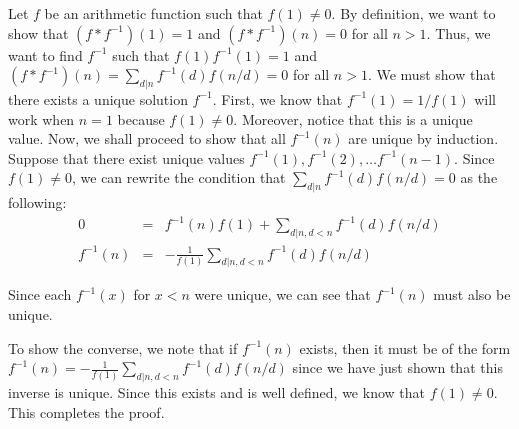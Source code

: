 \documentclass[psamsfonts]{amsart}
\newenvironment{sol}{{\bfseries Solution}}{\qedsymbol}
\theoremstyle{definition}
\theoremstyle{remark}
\numberwithin{equation}{section}
\begin{document}
\begin{sol}
Let $f$ be an arithmetic function such that $f(1) \neq 0$. By definition, we want to show that $(f * f^{-1}) (1) = 1$ and $(f * f^{-1})(n) = 0$ for all $n > 1$. Thus, we want to find $f^{-1}$ such that $f(1)f^{-1}(1) = 1$ and $(f*f^{-1})(n) = \sum_{d|n} f^{-1} (d) f(n/d) = 0$ for all $n > 1$. We must show that there exists a unique solution $f^{-1}$. First, we know that $f^{-1}(1) = 1/f(1)$ will work when $n = 1$ because $f(1) \neq 0$. Moreover, notice that this is a unique value. Now, we shall proceed to show that all $f^{-1}(n)$ are unique by induction. Suppose that there exist unique values $f^{-1}(1), f^{-1}(2), \ldots f^{-1}(n-1)$. Since $f(1) \neq 0$, we can rewrite the condition that $\sum_{d|n} f^{-1} (d) f(n/d) = 0$ as the following:
\begin{eqnarray}
0 &=& f^{-1}(n)f(1) + \sum_{d|n, d<n} f^{-1} (d) f(n/d) \\
f^{-1}(n) &=& - \frac{1}{f(1)} \sum_{d|n, d<n} f^{-1} (d) f(n/d)
\end{eqnarray}

Since each $f^{-1}(x)$ for $x < n$ were unique, we can see that $f^{-1}(n)$ must also be unique. 

To show the converse, we note that if $f^{-1}(n)$ exists, then it must be of the form $f^{-1}(n) =  - \frac{1}{f(1)} \sum_{d|n, d<n} f^{-1} (d) f(n/d)$ since we have just shown that this inverse is unique. Since this exists and is well defined, we know that $f(1) \neq 0$. This completes the proof.
\end{sol}
\end{document}
